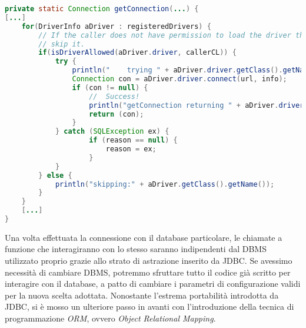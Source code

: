 \documentclass[12pt,a4paper,onecolumn,x11names]{article}
\begin{document}
\begin{lstlisting}[language=java, caption=Ciclo che controlla la validità del driver]
private static Connection getConnection(...) {
[...]
	for(DriverInfo aDriver : registeredDrivers) {
		// If the caller does not have permission to load the driver then
		// skip it.
		if(isDriverAllowed(aDriver.driver, callerCL)) {
			try {
				println("    trying " + aDriver.driver.getClass().getName());
				Connection con = aDriver.driver.connect(url, info);
				if (con != null) {
					// 	Success!
					println("getConnection returning " + aDriver.driver.getClass().getName());
					return (con);
				}
			} catch (SQLException ex) {
					if (reason == null) {
						reason = ex;
					}
			}
		} else {
			println("skipping:" + aDriver.getClass().getName());
		}
	}
	[...]
}
\end{lstlisting}
		\begin{flushleft}
			Una volta effettuata la connessione con il database particolare, le chiamate a funzione che interagiranno con lo stesso saranno indipendenti dal DBMS utilizzato proprio grazie allo strato di astrazione inserito da JDBC. Se avessimo necessità di cambiare DBMS, potremmo sfruttare tutto il codice già scritto per interagire con il database, a patto di cambiare i parametri di configurazione validi per la nuova scelta adottata.\newline
			Nonostante l'estrema portabilità introdotta da JDBC, si è mosso un ulteriore passo in avanti con l'introduzione della tecnica di programmazione \textit{ORM}, ovvero \textit{Object Relational Mapping}.
		\end{flushleft}
	
\end{document}
